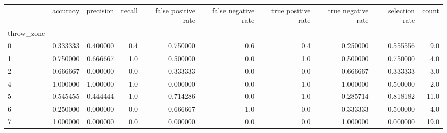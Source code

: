 \begin{tabular}{lrrrrrrrrr}
\toprule
{} &  accuracy &  precision &  recall &  false positive rate &  false negative rate &  true positive rate &  true negative rate &  selection rate &  count \\
throw\_zone &           &            &         &                      &                      &                     &                     &                 &        \\
\midrule
0          &  0.333333 &   0.400000 &     0.4 &             0.750000 &                  0.6 &                 0.4 &            0.250000 &        0.555556 &    9.0 \\
1          &  0.750000 &   0.666667 &     1.0 &             0.500000 &                  0.0 &                 1.0 &            0.500000 &        0.750000 &    4.0 \\
2          &  0.666667 &   0.000000 &     0.0 &             0.333333 &                  0.0 &                 0.0 &            0.666667 &        0.333333 &    3.0 \\
4          &  1.000000 &   1.000000 &     1.0 &             0.000000 &                  0.0 &                 1.0 &            1.000000 &        0.500000 &    2.0 \\
5          &  0.545455 &   0.444444 &     1.0 &             0.714286 &                  0.0 &                 1.0 &            0.285714 &        0.818182 &   11.0 \\
6          &  0.250000 &   0.000000 &     0.0 &             0.666667 &                  1.0 &                 0.0 &            0.333333 &        0.500000 &    4.0 \\
7          &  1.000000 &   0.000000 &     0.0 &             0.000000 &                  0.0 &                 0.0 &            1.000000 &        0.000000 &   19.0 \\
\bottomrule
\end{tabular}
